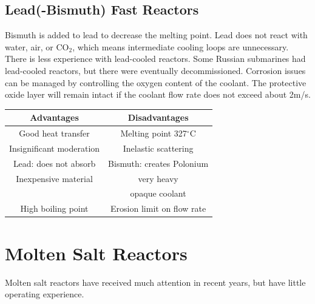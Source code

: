 \subsection{Lead(-Bismuth) Fast Reactors}
Bismuth is added to lead to decrease the melting point. Lead does not react with water, air, or CO$_2$, which means intermediate cooling loops are unnecessary. 
There is less experience with lead-cooled reactors. Some Russian submarines had lead-cooled reactors, but there were eventually decommissioned.
Corrosion issues can be managed by controlling the oxygen content of the coolant. The protective oxide layer will remain intact if the coolant flow rate does not exceed about 2m/s.
\begin{table}[!h]
\begin{tabular}{c|c}
  Advantages & Disadvantages \\
  \hline
  Good heat transfer & Melting point 327$^{\circ}$C\\
  Insignificant moderation & Inelastic scattering\\
  Lead: does not absorb & Bismuth: creates Polonium\\
  Inexpensive material & very heavy\\ 
   & opaque coolant\\
  High boiling point & Erosion limit on flow rate\\
\end{tabular}
\end{table}


\section{Molten Salt Reactors}
Molten salt reactors have received much attention in recent years, but have little operating experience. 


